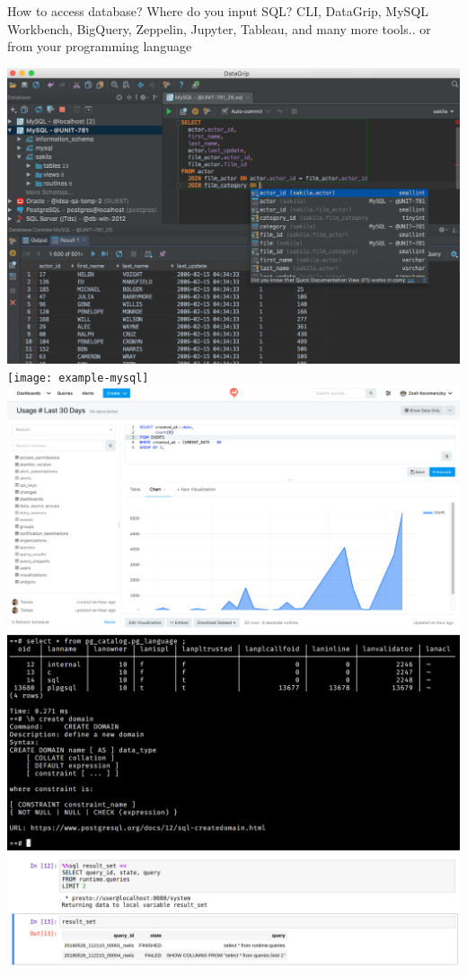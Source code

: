 \documentclass[t,pdf]{beamer}
\begin{document}
\begin{frame}{How to access database? Where do you input SQL?}
CLI, DataGrip, MySQL Workbench, BigQuery, Zeppelin, Jupyter, Tableau, and many more tools.. or from your programming language

\includegraphics[height=.22\textheight]{example-datagrip}
\texttt{[image: example-mysql]}
\includegraphics[height=.22\textheight]{example-bigquery}
\includegraphics[height=.22\textheight]{example-psql}
\includegraphics[height=.22\textheight]{example-jupyter}

\end{frame}
\end{document}
